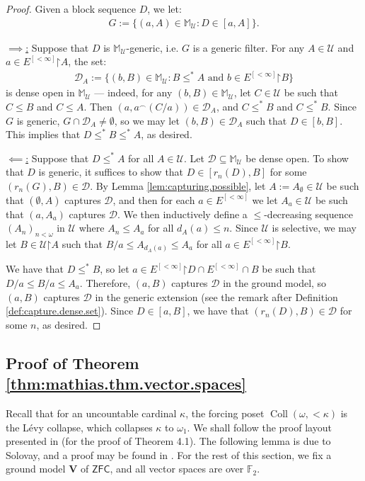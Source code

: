 \documentclass[10pt,a4paper]{amsart}
\theoremstyle{plain}
\numberwithin{equation}{section}
\theoremstyle{definition}
\newcommand{\func}{\operatorname}
\newcommand{\cal}{\mathcal}
\renewcommand{\bf}{\mathbf}
\newcommand{\ZFC}{\mathsf{ZFC}}
\newcommand{\restrictedto}{\mathord{\upharpoonright}}
\newcommand{\Coll}{\func{Coll}}
\newcommand{\U}{\cal{U}}
\newcommand{\V}{\bf{V}}
\newcommand{\D}{\cal{D}}
\begin{document}
\begin{proof}
    Given a block sequence $D$, we let:
    \begin{align*}
        G := \{(a,A) \in \mathbb{M}_\U : D \in [a,A]\}.
    \end{align*}

    \underline{$\implies$:} Suppose that $D$ is $\mathbb{M}_\U$-generic, i.e. $G$ is a generic filter. For any $A \in \U$ and $a \in E^{[<\infty]}\restrictedto A$, the set:
    \begin{align*}
        \D_A := \{(b,B) \in \mathbb{M}_\U : B \leq^* A \text{ and } b \in E^{[<\infty]}\restrictedto B\}
    \end{align*}
    is dense open in $\mathbb{M}_\U$ --- indeed, for any $(b,B) \in \mathbb{M}_\U$, let $C \in \U$ be such that $C \leq B$ and $C \leq A$. Then $(a,a^\frown(C/a)) \in \D_A$, and $C \leq^* B$ and $C \leq^* B$. Since $G$ is generic, $G \cap \D_A \neq \emptyset$, so we may let $(b,B) \in \D_A$ such that $D \in [b,B]$. This implies that $D \leq^* B \leq^* A$, as desired.

    \underline{$\impliedby$:} Suppose that $D \leq^* A$ for all $A \in \U$. Let $\D \subseteq \mathbb{M}_\U$ be dense open. To show that $D$ is generic, it suffices to show that $D \in [r_n(D),B]$ for some $(r_n(G),B) \in \D$. By Lemma \ref{lem:capturing.possible}, let $A := A_\emptyset \in \U$ be such that $(\emptyset,A)$ captures $\D$, and then for each $a \in E^{[<\infty]}$ we let $A_a \in \U$ be such that $(a,A_a)$ captures $\D$. We then inductively define a $\leq$-decreasing sequence $(A_n)_{n<\omega}$ in $\U$ where $A_n \leq A_a$ for all $d_A(a) \leq n$. Since $\U$ is selective, we may let $B \in \U\restrictedto A$ such that $B/a \leq A_{d_A(a)} \leq A_a$ for all $a \in E^{[<\infty]}\restrictedto B$. 

    We have that $D \leq^* B$, so let $a \in E^{[<\infty]}\restrictedto D \cap E^{[<\infty]} \cap B$  be such that $D/a \leq B/a \leq A_a$. Therefore, $(a,B)$ captures $\D$ in the ground model, so $(a,B)$ captures $\D$ in the generic extension (see the remark after Definition \ref{def:capture.dense.set}). Since $D \in [a,B]$, we have that $(r_n(D),B) \in \D$ for some $n$, as desired.
\end{proof}

\subsection{Proof of Theorem \ref{thm:mathias.thm.vector.spaces}}
Recall that for an uncountable cardinal $\kappa$, the forcing poset $\Coll(\omega,<\!\kappa)$ is the L\'{e}vy collapse, which collapses $\kappa$ to $\omega_1$. We shall follow the proof layout presented in \cite{NN18} (for the proof of Theorem 4.1). The following lemma is due to Solovay, and a proof may be found in \cite{solovay}. For the rest of this section, we fix a ground model $\V$ of $\ZFC$, and all vector spaces are over $\mathbb{F}_2$.
\end{document}

